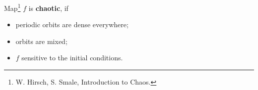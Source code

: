 Map\footnote{
    W. Hirsch, S. Smale, Introduction to Chaos.
} $f$ is \textbf{chaotic}, if \\
\begin{itemize}
    \item periodic orbits are dense everywhere;
    \item orbits are mixed;
    \item $f$ sensitive to the initial conditions.
\end{itemize}


